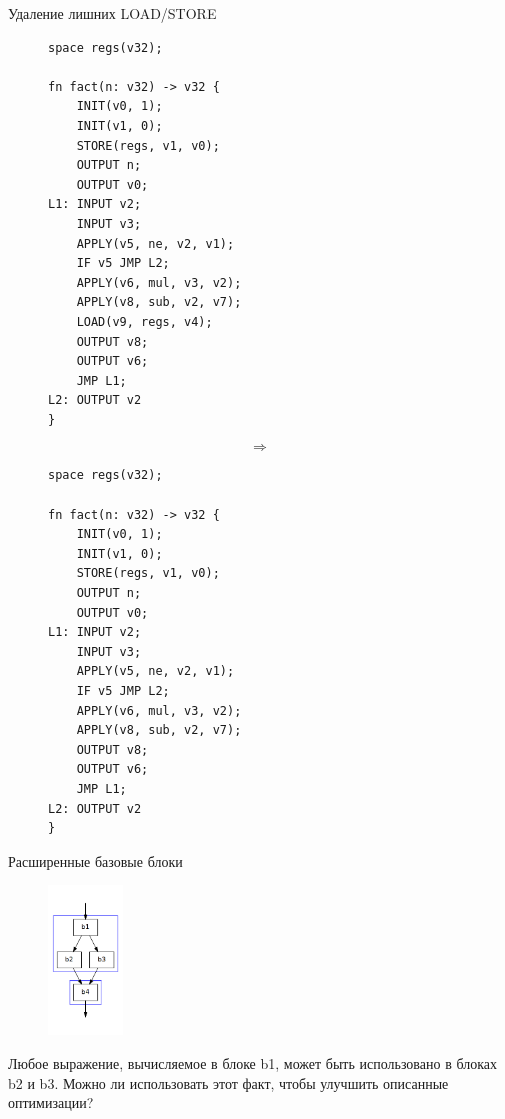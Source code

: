 \documentclass[presentation]{beamer}
\begin{document}
\begin{frame}[label={sec:org5fcce6c},fragile]{Удаление лишних LOAD/STORE}
 \begin{figure}
\begin{minipage}[t]{0.4\textwidth}
\begin{verbatim}
space regs(v32);

fn fact(n: v32) -> v32 {
    INIT(v0, 1);
    INIT(v1, 0);
    STORE(regs, v1, v0);
    OUTPUT n;
    OUTPUT v0;
L1: INPUT v2;
    INPUT v3;
    APPLY(v5, ne, v2, v1);
    IF v5 JMP L2;
    APPLY(v6, mul, v3, v2);
    APPLY(v8, sub, v2, v7);
    LOAD(v9, regs, v4);
    OUTPUT v8;
    OUTPUT v6;
    JMP L1;
L2: OUTPUT v2
}
\end{verbatim}
\end{minipage}%
\begin{minipage}[t]{0.2\textwidth}
$$\Longrightarrow$$
\end{minipage}%
\begin{minipage}[t]{0.4\textwidth}
\begin{verbatim}
space regs(v32);

fn fact(n: v32) -> v32 {
    INIT(v0, 1);
    INIT(v1, 0);
    STORE(regs, v1, v0);
    OUTPUT n;
    OUTPUT v0;
L1: INPUT v2;
    INPUT v3;
    APPLY(v5, ne, v2, v1);
    IF v5 JMP L2;
    APPLY(v6, mul, v3, v2);
    APPLY(v8, sub, v2, v7);
    OUTPUT v8;
    OUTPUT v6;
    JMP L1;
L2: OUTPUT v2
}
\end{verbatim}
\end{minipage}%
\end{figure}
\end{frame}
\begin{frame}[label={sec:orgfd5884c}]{Расширенные базовые блоки}
\begin{figure}
\includegraphics[height=150px]{cfg-ebb.png}
\end{figure}
Любое выражение, вычисляемое в блоке b1, может быть использовано в блоках b2 и b3. 
\alert{Можно ли использовать этот факт, чтобы улучшить описанные оптимизации?}
\end{frame}
\end{document}

